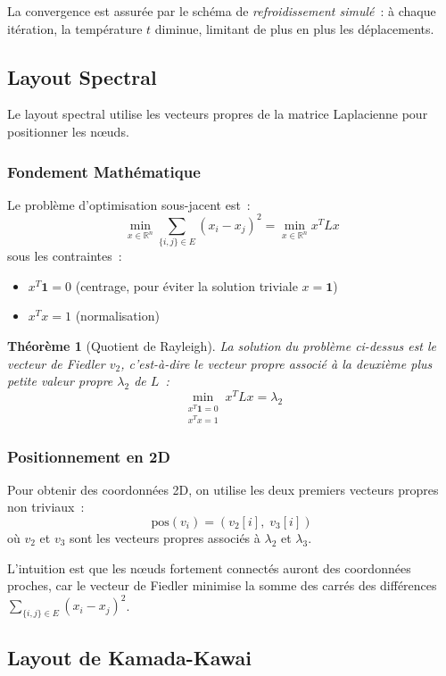 \documentclass[12pt,a4paper]{article}
\newtheorem{theoreme}{Théorème}[section]
\begin{document}
La convergence est assurée par le schéma de \emph{refroidissement simulé}~: à chaque itération, la température $t$ diminue, limitant de plus en plus les déplacements.

\subsection{Layout Spectral}

Le layout spectral utilise les vecteurs propres de la matrice Laplacienne pour positionner les n\oe{}uds.

\subsubsection{Fondement Mathématique}

Le problème d'optimisation sous-jacent est~:
\[
    \min_{x \in \mathbb{R}^n} \sum_{\{i,j\} \in E} (x_i - x_j)^2 = \min_{x \in \mathbb{R}^n} x^T L x
\]
sous les contraintes~:
\begin{itemize}
    \item $x^T \mathbf{1} = 0$ (centrage, pour éviter la solution triviale $x = \mathbf{1}$)
    \item $x^T x = 1$ (normalisation)
\end{itemize}

\begin{theoreme}[Quotient de Rayleigh]
La solution du problème ci-dessus est le \emph{vecteur de Fiedler} $v_2$, c'est-à-dire le vecteur propre associé à la deuxième plus petite valeur propre $\lambda_2$ de $L$~:
\[
    \min_{\substack{x^T \mathbf{1} = 0 \\ x^T x = 1}} x^T L x = \lambda_2
\]
\end{theoreme}

\subsubsection{Positionnement en 2D}

Pour obtenir des coordonnées 2D, on utilise les deux premiers vecteurs propres non triviaux~:
\[
    \text{pos}(v_i) = (v_2[i], \; v_3[i])
\]
où $v_2$ et $v_3$ sont les vecteurs propres associés à $\lambda_2$ et $\lambda_3$.

L'intuition est que les n\oe{}uds fortement connectés auront des coordonnées proches, car le vecteur de Fiedler minimise la somme des carrés des différences $\sum_{\{i,j\} \in E} (x_i - x_j)^2$.

\subsection{Layout de Kamada-Kawai}
\end{document}
